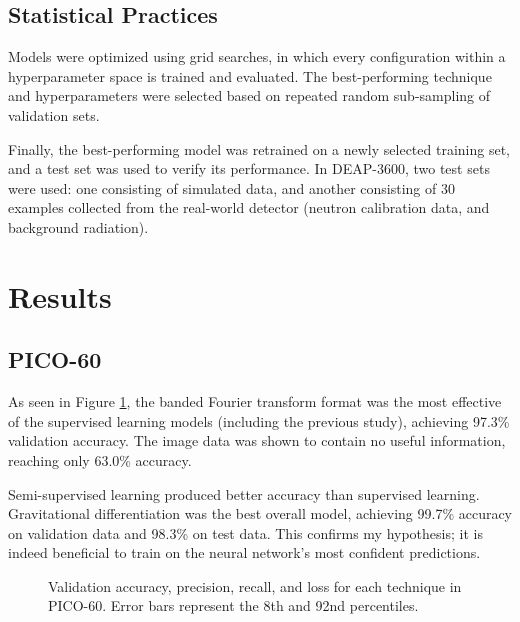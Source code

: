 \documentclass[12pt]{article}
\begin{document}
\subsection{Statistical Practices}

Models were optimized using grid searches, in which every configuration within a hyperparameter space is trained and evaluated. The best-performing technique and hyperparameters were selected based on repeated random sub-sampling of validation sets.

Finally, the best-performing model was retrained on a newly selected training set, and a test set was used to verify its performance. In DEAP-3600, two test sets were used: one consisting of simulated data, and another consisting of 30 examples collected from the real-world detector (neutron calibration data, and background radiation).

\section{Results}

\subsection{PICO-60}

As seen in Figure \ref{pico_final_results}, the banded Fourier transform format was the most effective of the supervised learning models (including the previous study), achieving 97.3\% validation accuracy. The image data was shown to contain no useful information, reaching only 63.0\% accuracy.

Semi-supervised learning produced better accuracy than supervised learning. Gravitational differentiation was the best overall model, achieving 99.7\% accuracy on validation data and 98.3\% on test data. This confirms my hypothesis; it is indeed beneficial to train on the neural network's most confident predictions.

\begin{figure}[ht]
    \centering
    \caption{\label{pico_final_results} Validation accuracy, precision, recall, and loss for each technique in PICO-60. Error bars represent the 8th and 92nd percentiles.}
\end{figure}
\end{document}
